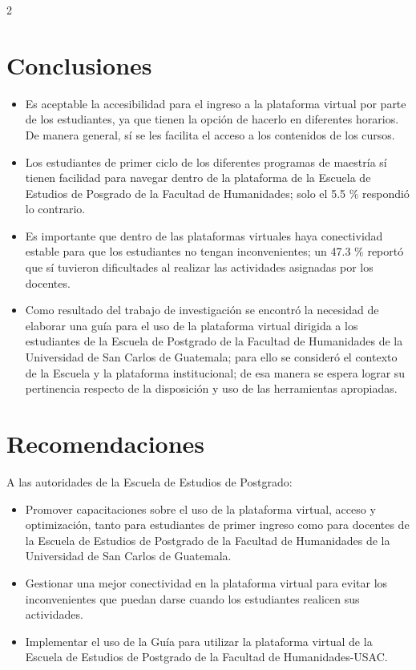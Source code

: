 \documentclass[12pt,spanish,Letterpaper,openany]{book}
\begin{document}
\begin {multicols}{2}
\hypertarget{conclusiones-1}{%
\section{Conclusiones}\label{conclusiones-1}}

\begin{itemize}
\item
  Es aceptable la accesibilidad para el ingreso a la plataforma virtual por parte de los
  estudiantes, ya que tienen la opción de hacerlo en diferentes horarios. De manera general,
  sí se les facilita el acceso a los contenidos de los cursos.
\item
  Los estudiantes de primer ciclo de los diferentes programas de maestría sí tienen facilidad
  para navegar dentro de la plataforma de la Escuela de Estudios de Posgrado de la Facultad
  de Humanidades; solo el 5.5 \% respondió lo contrario.
\item
  Es importante que dentro de las plataformas virtuales haya conectividad estable para que
  los estudiantes no tengan inconvenientes; un 47.3 \% reportó que sí tuvieron dificultades al
  realizar las actividades asignadas por los docentes.
\item
  Como resultado del trabajo de investigación se encontró la necesidad de elaborar una guía
  para el uso de la plataforma virtual dirigida a los estudiantes de la Escuela de Postgrado de
  la Facultad de Humanidades de la Universidad de San Carlos de Guatemala; para ello se
  consideró el contexto de la Escuela y la plataforma institucional; de esa manera se espera
  lograr su pertinencia respecto de la disposición y uso de las herramientas apropiadas.
\end{itemize}

\hypertarget{recomendaciones-1}{%
\section{Recomendaciones}\label{recomendaciones-1}}

A las autoridades de la Escuela de Estudios de Postgrado:

\begin{itemize}
\item
  Promover capacitaciones sobre el uso de la plataforma virtual, acceso y optimización, tanto
  para estudiantes de primer ingreso como para docentes de la Escuela de Estudios de
  Postgrado de la Facultad de Humanidades de la Universidad de San Carlos de Guatemala.
\item
  Gestionar una mejor conectividad en la plataforma virtual para evitar los inconvenientes que
  puedan darse cuando los estudiantes realicen sus actividades.
\item
  Implementar el uso de la Guía para utilizar la plataforma virtual de la Escuela de Estudios
  de Postgrado de la Facultad de Humanidades-USAC.
\end{itemize}


\end{multicols}
\end{document}
